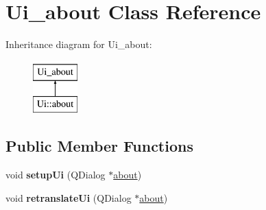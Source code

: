 \hypertarget{classUi__about}{
\section{Ui\_\-about Class Reference}
\label{classUi__about}
}
Inheritance diagram for Ui\_\-about:\begin{figure}[H]
\begin{center}
\leavevmode
\includegraphics[height=2.000000cm]{classUi__about}
\end{center}
\end{figure}
\subsection*{Public Member Functions}
\begin{DoxyCompactItemize}
\item 
\hypertarget{classUi__about_ade605029c03d96bbda6ca78d9e982804}{
void {\bfseries setupUi} (QDialog $\ast$\hyperlink{classabout}{about})}
\label{classUi__about_ade605029c03d96bbda6ca78d9e982804}

\item 
\hypertarget{classUi__about_aaba8586f919f4992e98e10f693f1e2dc}{
void {\bfseries retranslateUi} (QDialog $\ast$\hyperlink{classabout}{about})}
\label{classUi__about_aaba8586f919f4992e98e10f693f1e2dc}

\end{DoxyCompactItemize}
